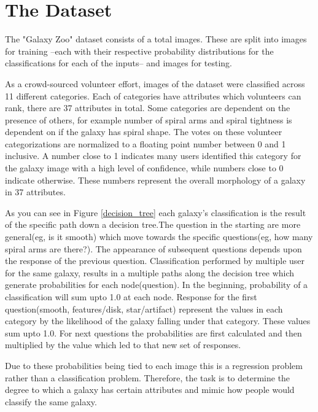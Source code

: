 \section{The Dataset}

The "Galaxy Zoo" dataset consists of a total  images. These are split into  images for training --each with their respective probability distributions for the classifications for each of the inputs-- and  images for testing.

As a crowd-sourced volunteer effort, images of the dataset were classified across 11 different categories. Each of categories have attributes which volunteers can rank, there are 37 attributes in total. Some categories are dependent on the presence of others, for example number of spiral arms and spiral tightness is dependent on if the galaxy has spiral shape. The votes on these volunteer categorizations are normalized to a floating point number between 0 and 1 inclusive. A number close to 1 indicates many users identified this category for the galaxy image with a high level of confidence, while numbers close to 0 indicate otherwise. These numbers represent the overall morphology of a galaxy in 37 attributes.

As you can see in Figure \ref{decision_tree} each galaxy's classification is the result of the specific path down a decision tree.The question in the starting are more general(eg, is it smooth) which move towards the specific questions(eg, how many spiral arms are there?). The appearance of subsequent questions depends upon the response of the previous question. Classification performed by multiple user for the same galaxy, results in a multiple paths along the decision tree which generate probabilities for each node(question). In the beginning, probability of a classification will sum upto 1.0 at each node. Response for the first question(smooth, features/disk, star/artifact) represent the values in each category by the likelihood of the galaxy falling under that category. These values sum upto 1.0. For next questions the probabilities are first calculated and then multiplied by the value which led to that new set of responses\cite{kaggledata}.  

Due to these probabilities being tied to each image this is a regression problem rather than a classification problem. Therefore, the task is to determine the degree to which a galaxy has certain attributes and mimic how people would classify the same galaxy.


